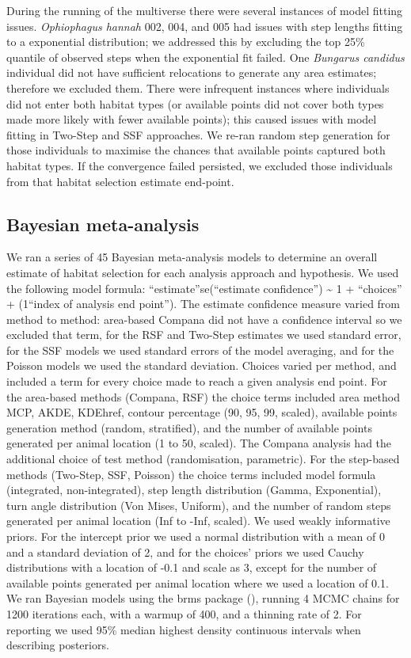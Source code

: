 \documentclass[10pt,a4paper]{article}
\begin{document}
During the running of the multiverse there were several instances of model fitting issues.
\emph{Ophiophagus hannah} 002, 004, and 005 had issues with step lengths fitting to a exponential distribution; we addressed this by excluding the top 25\% quantile of observed steps when the exponential fit failed.
One \emph{Bungarus candidus} individual did not have sufficient relocations to generate any area estimates; therefore we excluded them.
There were infrequent instances where individuals did not enter both habitat types (or available points did not cover both types made more likely with fewer available points); this caused issues with model fitting in Two-Step and SSF approaches.
We re-ran random step generation for those individuals to maximise the chances that available points captured both habitat types.
If the convergence failed persisted, we excluded those individuals from that habitat selection estimate end-point.

\subsection{Bayesian meta-analysis}\label{bayesian-meta-analysis}

We ran a series of 45 Bayesian meta-analysis models to determine an overall estimate of habitat selection for each analysis approach and hypothesis.
We used the following model formula: ``estimate''\textbar se(``estimate confidence'') \textasciitilde{} 1 + ``choices'' + (1\textbar{}``index of analysis end point'').
The estimate confidence measure varied from method to method: area-based Compana did not have a confidence interval so we excluded that term, for the RSF and Two-Step estimates we used standard error, for the SSF models we used standard errors of the model averaging, and for the Poisson models we used the standard deviation.
Choices varied per method, and included a term for every choice made to reach a given analysis end point.
For the area-based methods (Compana, RSF) the choice terms included area method MCP, AKDE, KDEhref, contour percentage (90, 95, 99, scaled), available points generation method (random, stratified), and the number of available points generated per animal location (1 to 50, scaled).
The Compana analysis had the additional choice of test method (randomisation, parametric).
For the step-based methods (Two-Step, SSF, Poisson) the choice terms included model formula (integrated, non-integrated), step length distribution (Gamma, Exponential), turn angle distribution (Von Mises, Uniform), and the number of random steps generated per animal location (Inf to -Inf, scaled).
We used weakly informative priors.
For the intercept prior we used a normal distribution with a mean of 0 and a standard deviation of 2, and for the choices' priors we used Cauchy distributions with a location of -0.1 and scale as 3, except for the number of available points generated per animal location where we used a location of 0.1.
We ran Bayesian models using the brms package (), running 4 MCMC chains for 1200 iterations each, with a warmup of 400, and a thinning rate of 2.
For reporting we used 95\% median highest density continuous intervals when describing posteriors.
\end{document}
